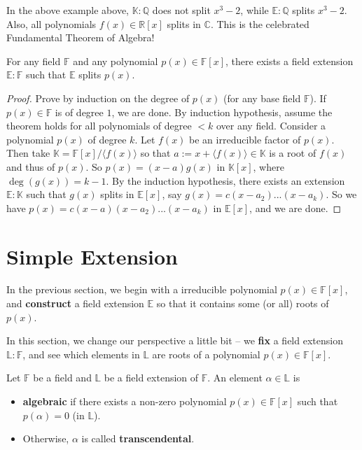 In the above example above, $\mathbb{K}: \mathbb{Q}$ does not split $x^3-2$, while $\mathbb{E} : \mathbb{Q}$ splits $x^3 -2$. Also, all polynomials $f(x) \in \mathbb{R}[x]$ splits in $\mathbb{C}$. This is the celebrated Fundamental Theorem of Algebra!



\begin{proposition}
For any field $\mathbb{F}$ and any polynomial $p(x) \in \mathbb{F}[x]$, there exists a field extension $\mathbb{E}:\mathbb{F}$ such that $\mathbb{E}$ splits $p(x)$.
\end{proposition}
\begin{proof}
Prove by induction on the degree of $p(x)$ (for any base field $\mathbb{F}$). If $p(x) \in \mathbb{F}$ is of degree $1$, we are done. By induction hypothesis, assume the theorem holds for all polynomials of degree $< k$ over any field. Consider a polynomial $p(x)$ of degree $k$. Let $f(x)$ be an irreducible factor of $p(x)$.
Then take $\mathbb{K} = \mathbb{F}[x]/\langle f(x) \rangle$ so that $a := x + \langle f(x) \rangle \in \mathbb{K}$ is a root of $f(x)$ and thus of $p(x)$.
So $p(x) = (x-a) g(x)$ in $\mathbb{K}[x]$, where $\deg(g(x)) = k-1$.
By the induction hypothesis, there exists an extension $\mathbb{E}:\mathbb{K}$ such that $g(x)$ splits in $\mathbb{E}[x]$, say $g(x) = c(x-a_2)...(x-a_k)$. So we have $p(x) = c(x-a)(x-a_2)...(x-a_k)$ in $\mathbb{E}[x]$, and we are done.
\end{proof}

\section{Simple Extension}
In the previous section, we begin with a irreducible polynomial $p(x) \in \mathbb{F}[x]$,  and {\bf construct} a field extension $\mathbb{E}$ so that it contains some (or all) roots of $p(x)$.

In this section, we change our perspective a little bit – we {\bf fix} a field extension $\mathbb{L}:\mathbb{F}$, and see which elements
in $\mathbb{L}$ are roots of a polynomial $p(x) \in \mathbb{F}[x]$.

\begin{definition}
Let $\mathbb{F}$ be a field and $\mathbb{L}$ be a field extension of $\mathbb{F}$.
An element $\alpha \in \mathbb{L}$ is
\begin{itemize}
    \item \textbf{algebraic} if there exists a non-zero polynomial $p(x) \in \mathbb{F}[x]$ such that $p(\alpha)=0$ (in $\mathbb{L}$).
    \item Otherwise, $\alpha$ is called \textbf{transcendental}.
\end{itemize}
\end{definition}

